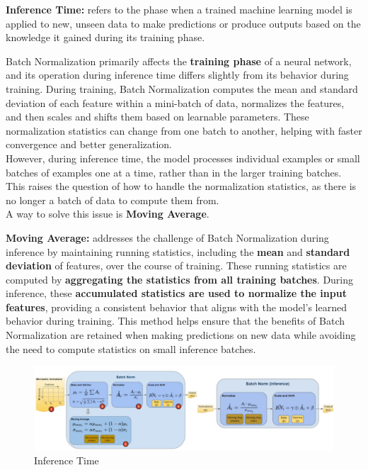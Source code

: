 \begin{definition}
    \textbf{Inference Time:} refers to the phase when a trained machine learning model is applied to new, unseen data to make predictions or produce outputs based on the knowledge it gained during its training phase.
\end{definition}

Batch Normalization primarily affects the \textbf{training phase} of a neural network, and its operation during inference time differs slightly from its behavior during training. During training, Batch Normalization computes the mean and standard deviation of each feature within a mini-batch of data, normalizes the features, and then scales and shifts them based on learnable parameters. These normalization statistics can change from one batch to another, helping with faster convergence and better generalization.\\

However, during inference time, the model processes individual examples or small batches of examples one at a time, rather than in the larger training batches. This raises the question of how to handle the normalization statistics, as there is no longer a batch of data to compute them from.\\

A way to solve this issue is \textbf{Moving Average}. 

\begin{definition}
    \textbf{Moving Average:} addresses the challenge of Batch Normalization during inference by maintaining running statistics, including the\textbf{ mean} and \textbf{standard deviation} of features, over the course of training. These running statistics are computed by \textbf{aggregating the statistics from all training batches}. During inference, these \textbf{accumulated statistics are used to normalize the input features}, providing a consistent behavior that aligns with the model's learned behavior during training. This method helps ensure that the benefits of Batch Normalization are retained when making predictions on new data while avoiding the need to compute statistics on small inference batches.
\end{definition}

\begin{figure}[h!t]
    \centering
    \includegraphics[width=1\linewidth]{batchnormalizationinference.png}
    \caption{Inference Time}
    \label{fig:enter-label}
\end{figure}

